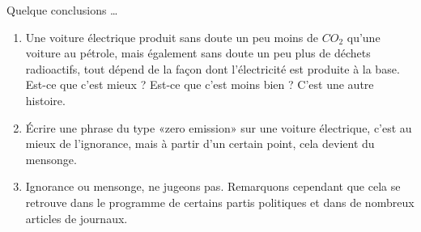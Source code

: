 Quelque conclusions \ldots
\begin{enumerate}

	\item
		Une voiture électrique produit sans doute un peu moins de $CO_2$ qu'une voiture au pétrole, mais également sans doute un peu plus de déchets radioactifs, tout dépend de la façon dont l'électricité est produite à la base. Est-ce que c'est mieux ? Est-ce que c'est moins bien ? C'est une autre histoire.

	\item
		Écrire une phrase du type «zero emission» sur une voiture électrique, c'est au mieux de l'ignorance, mais à partir d'un certain point, cela devient du mensonge.
	
	\item
		Ignorance ou mensonge, ne jugeons pas. Remarquons cependant que cela se retrouve dans le programme de certains partis politiques et dans de nombreux articles de journaux.


\end{enumerate}


